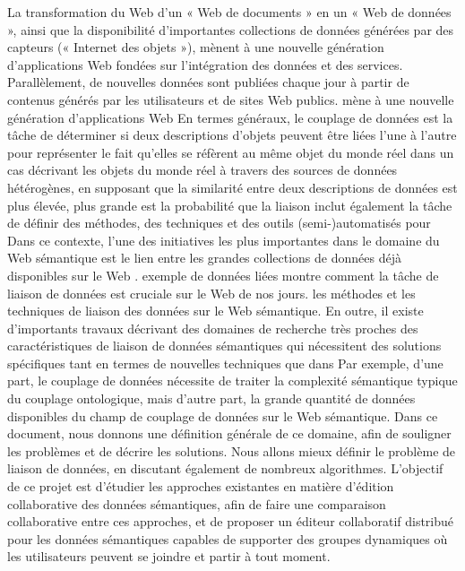 \documentclass[12pt]{report}
\begin{document}
La transformation du Web d’un « Web de documents » en un « Web de données », ainsi que la disponibilité d’importantes collections de données générées par des capteurs (« Internet des objets »), mènent à une nouvelle génération d’applications Web fondées sur l’intégration des données et des services. Parallèlement, de nouvelles données sont publiées chaque jour à partir de contenus générés par les utilisateurs et de sites Web publics. mène à une nouvelle génération d’applications Web En termes généraux, le couplage de données est la tâche de déterminer si deux descriptions d’objets peuvent être liées l’une à l’autre pour représenter le fait qu’elles se réfèrent au même objet du monde réel dans un cas décrivant les objets du monde réel à travers des sources de données hétérogènes, en supposant que la similarité entre deux descriptions de données est plus élevée, plus grande est la probabilité que la liaison inclut également la tâche de définir des méthodes, des techniques et des outils (semi-)automatisés pour Dans ce contexte, l’une des initiatives les plus importantes dans le domaine du Web sémantique est le lien entre les grandes collections de données déjà disponibles sur le Web \cite{LDOW}. exemple de données liées montre comment la tâche de liaison de données est cruciale sur le Web de nos jours. les méthodes et les techniques de liaison des données sur le Web sémantique. En outre, il existe d’importants travaux décrivant des domaines de recherche très proches des caractéristiques de liaison de données sémantiques qui nécessitent des solutions spécifiques tant en termes de nouvelles techniques que dans Par exemple, d’une part, le couplage de données nécessite de traiter la complexité sémantique typique du couplage ontologique, mais d’autre part, la grande quantité de données disponibles du champ de couplage de données sur le Web sémantique. Dans ce document, nous donnons une définition générale de ce domaine, afin de souligner les problèmes et de décrire les solutions. Nous allons mieux définir le problème de liaison de données, en discutant également de nombreux algorithmes. L’objectif de ce projet est d’étudier les approches existantes en matière d’édition collaborative des données sémantiques, afin de faire une comparaison collaborative entre ces approches, et de proposer un éditeur collaboratif distribué pour les données sémantiques capables de supporter des groupes dynamiques où les utilisateurs peuvent se joindre et partir à tout moment.\cite{WLD}
\end{document}
